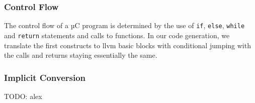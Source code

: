 \subsubsection{Control Flow}

The control flow of a µC program is determined by the use of \texttt{if}, \texttt{else}, \texttt{while} and \texttt{return} statements and calls to functions. In our code generation, we translate the first constructs to llvm basic blocks with conditional jumping with the calls and returns staying essentially the same.

\subsubsection{Implicit Conversion}
TODO: alex
